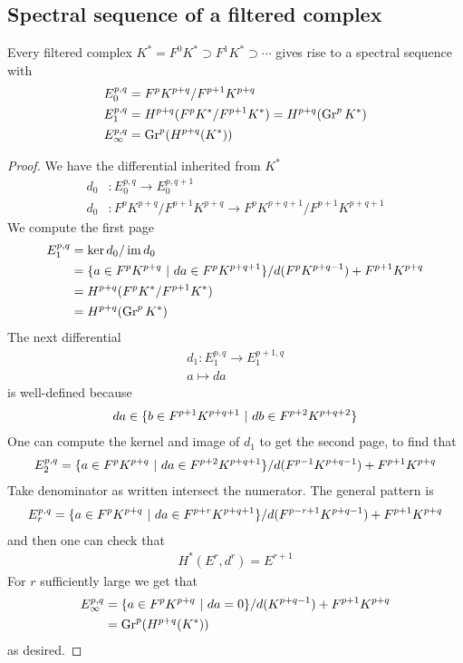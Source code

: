 \documentclass[12pt]{article}
\begin{document}
\subsection{Spectral sequence of a filtered complex}
\begin{proposition}
    Every filtered complex $K^* = F^0K^* \supset F^1K^* \supset \cdots$ gives rise 
    to a spectral sequence with \begin{align*}
        E_0^{p,q} &= F^pK^{p+q}/F^{p+1}K^{p+q} \\
        E_1^{p,q} &= H^{p+q}(F^pK^*/F^{p+1}K^*) = H^{p+q}(\operatorname{Gr}^p K^*) \\
        E_\infty^{p,q} &= \operatorname{Gr}^p(H^{p+q}(K^*))
    \end{align*}
\end{proposition}
\begin{proof}
    We have the differential inherited from $K^*$ \begin{align*}
        d_0&: E_0^{p,q} \to E_0^{p,q+1} \\
        d_0&: F^pK^{p+q}/F^{p+1}K^{p+q} \to F^pK^{p+q+1}/F^{p+1}K^{p+q+1}
    \end{align*}  We compute 
    the first page \begin{align*}
        E_1^{p,q} &= \ker d_0 / \operatorname{im} d_0 \\
        &= \{a\in F^pK^{p+q} \ \vert \  da \in F^pK^{p+q+1}\} / d(F^pK^{p+q-1}) + F^{p+1}K^{p+q} \\
        &= H^{p+q}(F^pK^*/F^{p+1}K^*) \\
        &= H^{p+q}(\operatorname{Gr}^p K^*)
    \end{align*} The next differential \begin{align*}
        d_1: E_1^{p,q} \to E_1^{p+1,q} \\
        a \mapsto da
    \end{align*} is well-defined because \begin{align*}
        da \in \{b\in F^{p+1}K^{p+q+1} \ \vert \  db \in F^{p+2}K^{p+q+2}\}
    \end{align*} One can compute the kernel and image of $d_1$ to get the second page,
    to find that \begin{align*}
        E_2^{p,q} = \{a \in F^pK^{p+q} \ \vert \  da \in F^{p+2}K^{p+q+1}\} / d(F^{p-1}K^{p+q-1}) + F^{p+1}K^{p+q}
    \end{align*} Take denominator as written intersect the numerator. The general pattern is \begin{align*}
        E_r^{p,q} = \{a \in F^pK^{p+q} \ \vert \  da \in F^{p+r}K^{p+q+1}\} / d(F^{p-r+1}K^{p+q-1}) + F^{p+1}K^{p+q}
    \end{align*} and then one can check that \begin{align*}
        H^*(E^r,d^r) = E^{r+1}
    \end{align*} For $r$ sufficiently large we get that \begin{align*}
        E_\infty^{p,q} &= \{a\in F^pK^{p+q} \ \vert \  da = 0\} / d(K^{p+q-1}) + F^{p+1}K^{p+q} \\
        &= \operatorname{Gr}^p(H^{p+q}(K^*))
    \end{align*} as desired.
\end{proof}
\end{document}
